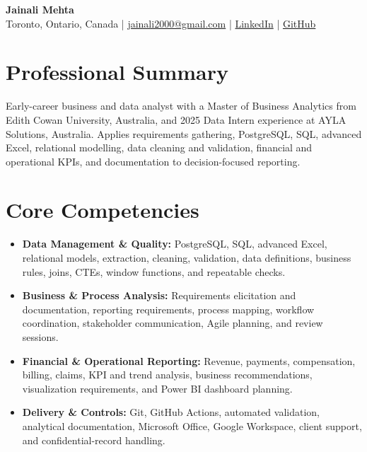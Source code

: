 \documentclass[letterpaper,10pt]{article}
\begin{document}
\begin{center}
  {\fontsize{17}{19}\selectfont\textbf{Jainali Mehta}}\\[2pt]
  \small Toronto, Ontario, Canada \;|\;
  \href{mailto:jainali2000@gmail.com}{jainali2000@gmail.com} \;|\;
  \href{https://www.linkedin.com/in/jainali-mehta}{LinkedIn} \;|\;
  \href{https://github.com/jainalimehta}{GitHub}
\end{center}
\vspace{-7pt}

\section{Professional Summary}
\small Early-career business and data analyst with a Master of Business Analytics from Edith Cowan University, Australia, and 2025 Data Intern experience at AYLA Solutions, Australia. Applies requirements gathering, PostgreSQL, SQL, advanced Excel, relational modelling, data cleaning and validation, financial and operational KPIs, and documentation to decision-focused reporting.

\section{Core Competencies}
\begin{itemize}[leftmargin=0.16in,label=\textbullet,topsep=0pt,itemsep=1pt,parsep=0pt]
  \item \small \textbf{Data Management \& Quality:} PostgreSQL, SQL, advanced Excel, relational models, extraction, cleaning, validation, data definitions, business rules, joins, CTEs, window functions, and repeatable checks.
  \item \small \textbf{Business \& Process Analysis:} Requirements elicitation and documentation, reporting requirements, process mapping, workflow coordination, stakeholder communication, Agile planning, and review sessions.
  \item \small \textbf{Financial \& Operational Reporting:} Revenue, payments, compensation, billing, claims, KPI and trend analysis, business recommendations, visualization requirements, and Power BI dashboard planning.
  \item \small \textbf{Delivery \& Controls:} Git, GitHub Actions, automated validation, analytical documentation, Microsoft Office, Google Workspace, client support, and confidential-record handling.
\end{itemize}
\end{document}
